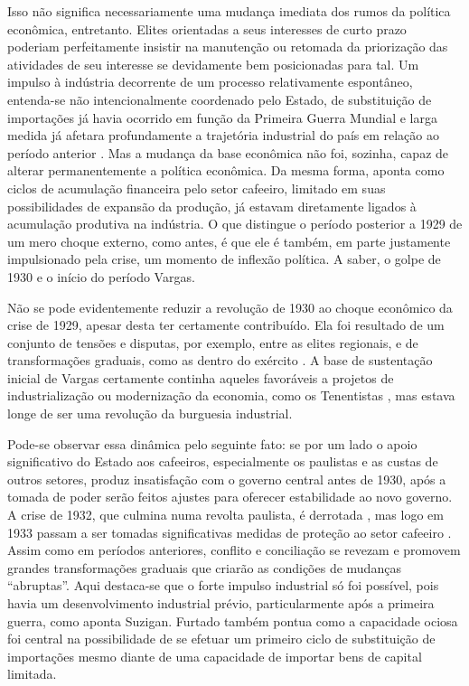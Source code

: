 Isso não significa necessariamente uma mudança imediata dos rumos da política
econômica, entretanto. Elites orientadas a seus interesses de curto
prazo poderiam perfeitamente insistir na manutenção ou retomada da
priorização das atividades de seu interesse se devidamente bem
posicionadas para tal. Um impulso à indústria decorrente de um processo
relativamente espontâneo, entenda-se não intencionalmente coordenado
pelo Estado, de substituição de importações já havia ocorrido em função
da Primeira Guerra Mundial e larga medida já afetara profundamente a
trajetória industrial do país em relação ao período anterior \citep[]{suzigan2000}.
Mas a mudança da base econômica não foi, sozinha, capaz de alterar permanentemente a
política econômica. Da mesma forma, \citep[]{mello1982} aponta como ciclos de
acumulação financeira pelo setor cafeeiro, limitado em suas
possibilidades de expansão da produção, já estavam diretamente ligados à
acumulação produtiva na indústria. O que distingue o período posterior a
1929 de um mero choque externo, como antes, é que ele é também, em parte
justamente impulsionado pela crise, um momento de inflexão 
política. A saber, o golpe de 1930 e o início do período Vargas.

Não se pode evidentemente reduzir a revolução de 1930 ao choque
econômico da crise de 1929, apesar desta ter certamente contribuído. Ela
foi resultado de um conjunto de tensões e disputas, por exemplo, entre as
elites regionais, e de transformações graduais, como as dentro do
exército \citep[]{perissinotto_ideias_2023}. A base de sustentação inicial de Vargas certamente
continha aqueles favoráveis a projetos de industrialização ou
modernização da economia, como os Tenentistas \citep[]{schwarcz_brasil_2015},
mas estava longe
de ser uma revolução da burguesia industrial.

Pode-se observar essa dinâmica pelo seguinte fato:
se por um lado o apoio significativo do Estado aos cafeeiros,
especialmente os paulistas e as custas de outros setores, produz
insatisfação com o governo central antes de 1930, após a tomada de poder
serão feitos ajustes para oferecer estabilidade ao novo governo. A crise
de 1932, que culmina numa revolta paulista, é derrotada \citep[]{schwarcz_brasil_2015}, mas
logo em 1933 passam a ser tomadas significativas medidas de proteção ao
setor cafeeiro \citep{furtado2005}. Assim como em períodos anteriores, conflito e
conciliação se revezam e promovem grandes transformações graduais que
criarão as condições de mudanças ``abruptas''. Aqui destaca-se que o
forte impulso industrial só foi possível, pois havia um desenvolvimento
industrial prévio, particularmente após a primeira guerra, como aponta
Suzigan\citeyearpar[]{suzigan2000}. 
Furtado \citeyearpar[]{furtado2005} também pontua como a capacidade ociosa foi central
na possibilidade de se efetuar um primeiro ciclo de substituição de
importações mesmo diante de uma capacidade de importar bens de capital
limitada.

